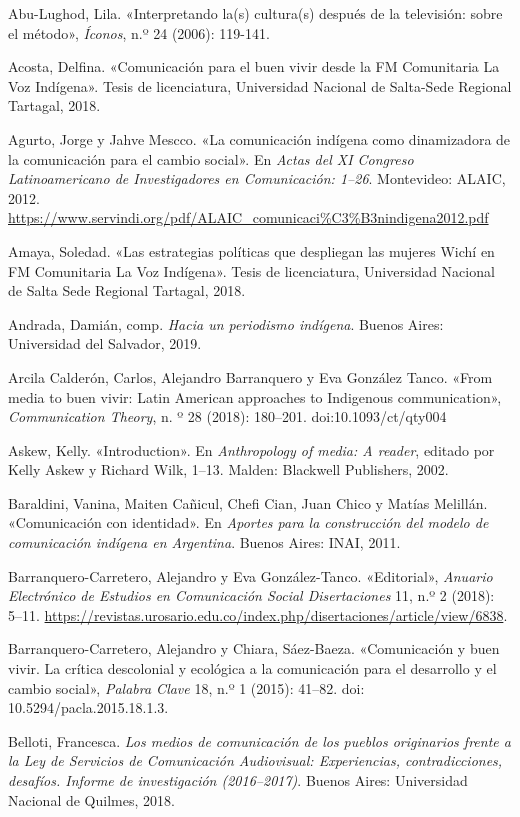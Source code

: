 \documentclass{tufte-handout}
\begin{document}
\begin{hangparas}{.25in}{1} 



Abu-Lughod, Lila. «Interpretando la(s) cultura(s) después de la
televisión: sobre el método», \emph{Íconos}, n.º 24 (2006): 119-141.

Acosta, Delfina. «Comunicación para el buen vivir desde la FM
Comunitaria La Voz Indígena». Tesis de licenciatura, Universidad
Nacional de Salta-Sede Regional Tartagal, 2018.

Agurto, Jorge y Jahve Mescco. «La comunicación indígena como
dinamizadora de la comunicación para el cambio social». En \emph{Actas
del XI Congreso Latinoamericano de Investigadores en Comunicación:
1--26}. Montevideo: ALAIC, 2012.
\url{https://www.servindi.org/pdf/ALAIC_comunicaci\%C3\%B3nindigena2012.pdf}

Amaya, Soledad. «Las estrategias políticas que despliegan las mujeres
Wichí en FM Comunitaria La Voz Indígena». Tesis de licenciatura,
Universidad Nacional de Salta Sede Regional Tartagal, 2018.

Andrada, Damián, comp. \emph{Hacia un periodismo indígena}. Buenos
Aires: Universidad del Salvador, 2019.

Arcila Calderón, Carlos, Alejandro Barranquero y Eva González Tanco.
«From media to buen vivir: Latin American approaches to Indigenous
communication», \emph{Communication Theory}, n. º 28 (2018): 180--201.
doi:10.1093/ct/qty004

Askew, Kelly. «Introduction». En \emph{Anthropology of media: A reader},
editado por Kelly Askew y Richard Wilk, 1--13. Malden: Blackwell
Publishers, 2002.

Baraldini, Vanina, Maiten Cañicul, Chefi Cian, Juan Chico y Matías
Melillán. «Comunicación con identidad». En \emph{Aportes para la
construcción del modelo de comunicación indígena en Argentina}. Buenos
Aires: INAI, 2011.

Barranquero-Carretero, Alejandro y Eva González-Tanco. «Editorial»,
\emph{Anuario Electrónico de Estudios en Comunicación Social
Disertaciones} 11, n.º 2 (2018): 5--11.
\url{https://revistas.urosario.edu.co/index.php/disertaciones/article/view/6838}.

Barranquero-Carretero, Alejandro y Chiara, Sáez-Baeza. «Comunicación y
buen vivir. La crítica descolonial y ecológica a la comunicación para el
desarrollo y el cambio social», \emph{Palabra Clave} 18, n.º 1 (2015):
41--82. doi: 10.5294/pacla.2015.18.1.3.

Belloti, Francesca. \emph{Los medios de comunicación de los pueblos
originarios frente a la Ley de Servicios de Comunicación Audiovisual:
Experiencias, contradicciones, desafíos. Informe de investigación
(2016--2017)}. Buenos Aires: Universidad Nacional de Quilmes, 2018.


\end{hangparas}
\end{document}
